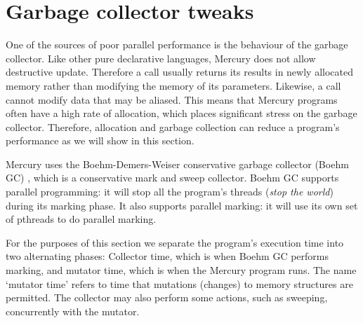 
\section{Garbage collector tweaks}
\label{sec:rts_gc}

One of the sources of poor parallel performance is the behaviour of the
garbage collector.
Like other pure declarative languages,
Mercury does not allow destructive update.
Therefore a call usually returns its results in newly allocated memory
rather than modifying the memory of its parameters.
Likewise, a call cannot modify data that may be aliased.
This means that Mercury programs often have a high rate of allocation,
which places significant stress on the garbage collector.
Therefore,
allocation and garbage collection can reduce a program's
performance as we will show in this section.

Mercury uses the Boehm-Demers-Weiser conservative garbage collector (Boehm GC)
\citep{boehm:1988:gc},
which is a conservative mark and sweep collector.
Boehm GC supports parallel programming:
it will stop all the program's threads (\emph{stop the world}) during its
marking phase.
It also supports parallel marking:
it will use its own set of pthreads to do parallel marking.

For the purposes of this section
we separate the program's execution time into two alternating phases:
Collector time, which is when Boehm GC performs marking,
and mutator time, which is when the Mercury program runs.
The name `mutator time' refers to time that mutations (changes) to memory
structures are permitted.
The collector may also perform some actions,
such as sweeping,
concurrently with the mutator.

